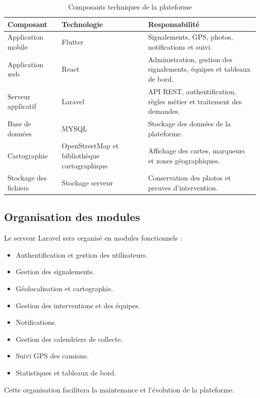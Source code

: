 \documentclass[11pt,a4paper,oneside]{report}
\begin{document}
	\begin{table}[H]
		\centering
		\small
		\renewcommand{\arraystretch}{1.2}
		\begin{tabular}{|p{3cm}|p{2.8cm}|p{7cm}|}
			\hline
			\textbf{Composant} & \textbf{Technologie} & \textbf{Responsabilité} \\
			\hline
			Application mobile & Flutter & Signalements, GPS, photos, notifications et suivi. \\
			\hline
			Application web & React & Administration, gestion des signalements, équipes et tableaux de bord. \\
			\hline
			Serveur applicatif & Laravel & API REST, authentification, règles métier et traitement des demandes. \\
			\hline
			Base de données & MYSQL & Stockage des données de la plateforme. \\
			\hline
			Cartographie & OpenStreetMap et bibliothèque cartographique & Affichage des cartes, marqueurs et zones géographiques. \\
			\hline
			Stockage des fichiers & Stockage serveur & Conservation des photos et preuves d'intervention. \\
			\hline
		\end{tabular}
		\caption{Composants techniques de la plateforme}
	\end{table}
	
	\subsection{Organisation des modules}
	
	Le serveur Laravel sera organisé en modules fonctionnels :
	
	\begin{itemize}
		\item Authentification et gestion des utilisateurs.
		\item Gestion des signalements.
		\item Géolocalisation et cartographie.
		\item Gestion des interventions et des équipes.
		\item Notifications.
		\item Gestion des calendriers de collecte.
		\item Suivi GPS des camions.
		\item Statistiques et tableaux de bord.
	\end{itemize}
	
	Cette organisation facilitera la maintenance et l'évolution
	de la plateforme.
	
\end{document}
